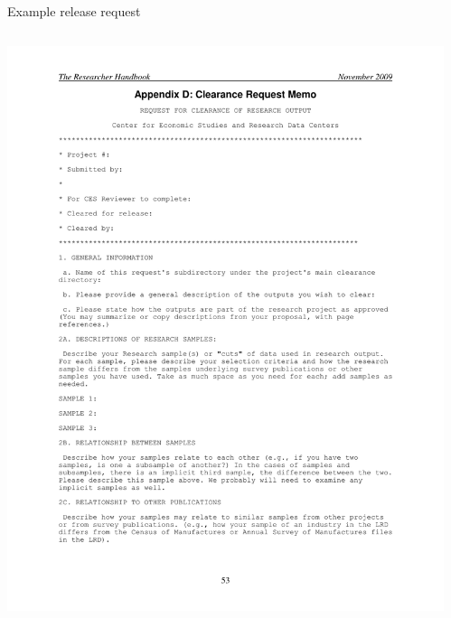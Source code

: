 \begin{frame}{Example release request}
\begin{columns}[T]
\begin{column}{0.49\textwidth}
\includegraphics[width=\textwidth]{RDCDisclosureRequestMemo.pdf}
\end{column}\pause
\begin{column}{0.49\textwidth}

\end{column}
\end{columns}
\end{frame}
